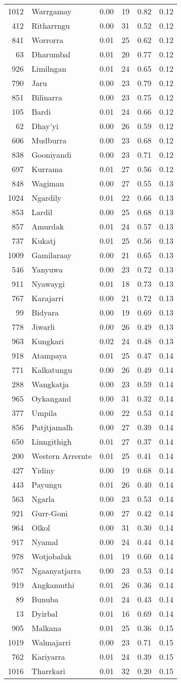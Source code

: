 \begin{longtable}[]{@{}rlrrrr@{}}
1012 & Warrgamay & 0.00 & 19 & 0.82 & 0.12\tabularnewline
412 & Ritharrngu & 0.00 & 31 & 0.52 & 0.12\tabularnewline
841 & Worrorra & 0.01 & 25 & 0.62 & 0.12\tabularnewline
63 & Dharumbal & 0.01 & 20 & 0.77 & 0.12\tabularnewline
926 & Limilngan & 0.01 & 24 & 0.65 & 0.12\tabularnewline
790 & Jaru & 0.00 & 23 & 0.79 & 0.12\tabularnewline
851 & Bilinarra & 0.00 & 23 & 0.75 & 0.12\tabularnewline
105 & Bardi & 0.01 & 24 & 0.66 & 0.12\tabularnewline
62 & Dhay'yi & 0.00 & 26 & 0.59 & 0.12\tabularnewline
606 & Mudburra & 0.00 & 23 & 0.68 & 0.12\tabularnewline
838 & Gooniyandi & 0.00 & 23 & 0.71 & 0.12\tabularnewline
697 & Kurrama & 0.01 & 27 & 0.56 & 0.12\tabularnewline
848 & Wagiman & 0.00 & 27 & 0.55 & 0.13\tabularnewline
1024 & Ngardily & 0.01 & 22 & 0.66 & 0.13\tabularnewline
853 & Lardil & 0.00 & 25 & 0.68 & 0.13\tabularnewline
857 & Amurdak & 0.01 & 24 & 0.57 & 0.13\tabularnewline
737 & Kukatj & 0.01 & 25 & 0.56 & 0.13\tabularnewline
1009 & Gamilaraay & 0.00 & 21 & 0.65 & 0.13\tabularnewline
546 & Yanyuwa & 0.00 & 23 & 0.72 & 0.13\tabularnewline
911 & Nyawaygi & 0.01 & 18 & 0.73 & 0.13\tabularnewline
767 & Karajarri & 0.00 & 21 & 0.72 & 0.13\tabularnewline
99 & Bidyara & 0.00 & 19 & 0.69 & 0.13\tabularnewline
778 & Jiwarli & 0.00 & 26 & 0.49 & 0.13\tabularnewline
963 & Kungkari & 0.02 & 24 & 0.48 & 0.13\tabularnewline
918 & Atampaya & 0.01 & 25 & 0.47 & 0.14\tabularnewline
771 & Kalkatungu & 0.00 & 26 & 0.49 & 0.14\tabularnewline
288 & Wangkatja & 0.00 & 23 & 0.59 & 0.14\tabularnewline
965 & Oykangand & 0.00 & 31 & 0.32 & 0.14\tabularnewline
377 & Umpila & 0.00 & 22 & 0.53 & 0.14\tabularnewline
856 & Patjtjamalh & 0.00 & 27 & 0.39 & 0.14\tabularnewline
650 & Linngithigh & 0.01 & 27 & 0.37 & 0.14\tabularnewline
200 & Western Arrernte & 0.01 & 25 & 0.41 & 0.14\tabularnewline
427 & Yidiny & 0.00 & 19 & 0.68 & 0.14\tabularnewline
443 & Payungu & 0.01 & 26 & 0.40 & 0.14\tabularnewline
563 & Ngarla & 0.00 & 23 & 0.53 & 0.14\tabularnewline
921 & Gurr-Goni & 0.00 & 27 & 0.42 & 0.14\tabularnewline
964 & Olkol & 0.00 & 31 & 0.30 & 0.14\tabularnewline
917 & Nyamal & 0.00 & 24 & 0.44 & 0.14\tabularnewline
978 & Wotjobaluk & 0.01 & 19 & 0.60 & 0.14\tabularnewline
957 & Ngaanyatjarra & 0.00 & 23 & 0.53 & 0.14\tabularnewline
919 & Angkamuthi & 0.01 & 26 & 0.36 & 0.14\tabularnewline
89 & Bunuba & 0.01 & 24 & 0.43 & 0.14\tabularnewline
13 & Dyirbal & 0.01 & 16 & 0.69 & 0.14\tabularnewline
905 & Malkana & 0.01 & 25 & 0.36 & 0.15\tabularnewline
1019 & Walmajarri & 0.00 & 23 & 0.71 & 0.15\tabularnewline
762 & Kariyarra & 0.01 & 24 & 0.39 & 0.15\tabularnewline
1016 & Tharrkari & 0.01 & 32 & 0.20 & 0.15\tabularnewline

\end{longtable}
